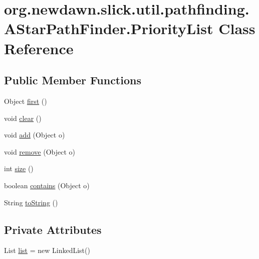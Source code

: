 \hypertarget{classorg_1_1newdawn_1_1slick_1_1util_1_1pathfinding_1_1_a_star_path_finder_1_1_priority_list}{}\section{org.\+newdawn.\+slick.\+util.\+pathfinding.\+A\+Star\+Path\+Finder.\+Priority\+List Class Reference}
\label{classorg_1_1newdawn_1_1slick_1_1util_1_1pathfinding_1_1_a_star_path_finder_1_1_priority_list}
\subsection*{Public Member Functions}
\begin{DoxyCompactItemize}
\item 
Object \mbox{\hyperlink{classorg_1_1newdawn_1_1slick_1_1util_1_1pathfinding_1_1_a_star_path_finder_1_1_priority_list_ad2e6435ff1feb6f838527d5e901d0d6c}{first}} ()
\item 
void \mbox{\hyperlink{classorg_1_1newdawn_1_1slick_1_1util_1_1pathfinding_1_1_a_star_path_finder_1_1_priority_list_aa9213d180d3cc63ae9762fac18d5ab0d}{clear}} ()
\item 
void \mbox{\hyperlink{classorg_1_1newdawn_1_1slick_1_1util_1_1pathfinding_1_1_a_star_path_finder_1_1_priority_list_a0515cf76de099aa00ffb61ef30fb6cb8}{add}} (Object o)
\item 
void \mbox{\hyperlink{classorg_1_1newdawn_1_1slick_1_1util_1_1pathfinding_1_1_a_star_path_finder_1_1_priority_list_a2876a214b6768f3aecdabdeed67a1986}{remove}} (Object o)
\item 
int \mbox{\hyperlink{classorg_1_1newdawn_1_1slick_1_1util_1_1pathfinding_1_1_a_star_path_finder_1_1_priority_list_ad086ea92d9ebfe4ecf9fea3d45cdb1e0}{size}} ()
\item 
boolean \mbox{\hyperlink{classorg_1_1newdawn_1_1slick_1_1util_1_1pathfinding_1_1_a_star_path_finder_1_1_priority_list_a4857c39dd90d962497b273845fe589c8}{contains}} (Object o)
\item 
String \mbox{\hyperlink{classorg_1_1newdawn_1_1slick_1_1util_1_1pathfinding_1_1_a_star_path_finder_1_1_priority_list_a68c13520047bd9e8315eff1b3685ba5b}{to\+String}} ()
\end{DoxyCompactItemize}
\subsection*{Private Attributes}
\begin{DoxyCompactItemize}
\item 
List \mbox{\hyperlink{classorg_1_1newdawn_1_1slick_1_1util_1_1pathfinding_1_1_a_star_path_finder_1_1_priority_list_a652f43252d1044a5a57102a8f30d2d47}{list}} = new Linked\+List()
\end{DoxyCompactItemize}


